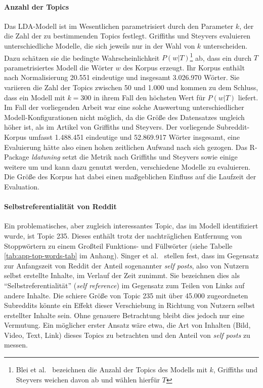 \documentclass[11pt,a4paper,twoside]{article}
\let\rmarkdownfootnote\footnote%
\def\footnote{\protect\rmarkdownfootnote}
\let\oldpar\paragraph
\renewcommand{\paragraph}{\oldpar*}
\begin{document}
\hypertarget{anzahl-der-topics}{%
\paragraph{Anzahl der Topics}\label{anzahl-der-topics}}

Das LDA-Modell ist im Wesentlichen parametrisiert durch den Parameter
\(k\), der die Zahl der zu bestimmenden Topics festlegt. Griffiths und
Steyvers \autocite{Griffiths2004} evaluieren unterschiedliche Modelle,
die sich jeweils nur in der Wahl von \(k\) unterscheiden. Dazu schätzen
sie die bedingte Wahrscheinlichkeit \(P(w|T)\)\footnote{Blei et
  al.~\autocite{Blei2003} bezeichnen die Anzahl der Topics des Modells
  mit \(k\), Griffiths und Steyvers weichen davon ab und wählen hierfür
  \(T\)} ab, dass ein durch \(T\) parametrisiertes Modell die Wörter
\(w\) des Korpus erzeugt. Ihr Korpus enthält nach Normalisierung 20.551
eindeutige und insgesamt 3.026.970 Wörter. Sie variieren die Zahl der
Topics zwischen 50 und 1.000 und kommen zu dem Schluss, dass ein Modell
mit \(k = 300\) in ihrem Fall den höchsten Wert für \(P(w|T)\) liefert.
Im Fall der vorliegenden Arbeit war eine solche Auswertung
unterschiedlicher Modell-Konfigurationen nicht möglich, da die Größe des
Datensatzes ungleich höher ist, als im Artikel von Griffiths und
Steyvers. Der vorliegende Subreddit-Korpus umfasst 1.488.451 eindeutige
und 52.869.917 Wörter insgesamt, eine Evaluierung hätte also einen hohen
zeitlichen Aufwand nach sich gezogen. Das R-Package \emph{ldatuning}
\autocite{R-ldatuning} setzt die Metrik nach Griffiths und Steyvers
sowie einige weitere um und kann dazu genutzt werden, verschiedene
Modelle zu evaluieren. Die Größe des Korpus hat dabei einen maßgeblichen
Einfluss auf die Laufzeit der Evaluation.

\hypertarget{selbstreferentialitat-von-reddit}{%
\paragraph{Selbstreferentialität von
Reddit}\label{selbstreferentialitat-von-reddit}}

Ein problematisches, aber zugleich interessantes Topic, das im Modell
identifiziert wurde, ist Topic 235. Dieses enthält trotz der
nachträglichen Entfernung von Stoppwörtern zu einem Großteil Funktions-
und Füllwörter (siehe Tabelle \ref{tab:app-top-words-tab} im Anhang).
Singer et al.~\autocite{Singer2014} stellen fest, dass im Gegensatz zur
Anfangszeit von Reddit der Anteil sogenannter \emph{self posts}, also
von Nutzern selbst erstellte Inhalte, im Verlauf der Zeit zunimmt. Sie
bezeichnen dies als \enquote{Selbstreferentialität} (\emph{self
reference}) im Gegensatz zum Teilen von Links auf andere Inhalte. Die
schiere Größe von Topic 235 mit über 45.000 zugeordneten Subreddits
könnte ein Effekt dieser Verschiebung in Richtung von Nutzern selbst
erstellter Inhalte sein. Ohne genauere Betrachtung bleibt dies jedoch
nur eine Vermutung. Ein möglicher erster Ansatz wäre etwa, die Art von
Inhalten (Bild, Video, Text, Link) dieses Topics zu betrachten und den
Anteil von \emph{self posts} zu messen.
\end{document}
